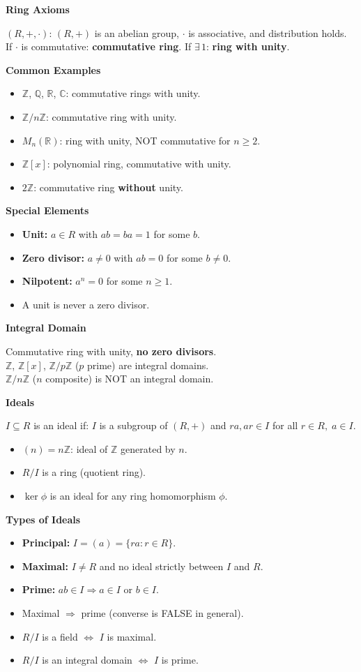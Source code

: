 \documentclass[10pt,twocolumn]{article}
\newcommand{\subsect}[1]{\smallskip\noindent\textbf{#1}\par}
\begin{document}
\subsect{Ring Axioms}
$(R,+,\cdot)$: $(R,+)$ is an abelian group, $\cdot$ is associative, and distribution holds.\\
If $\cdot$ is commutative: \textbf{commutative ring}. If $\exists\,1$: \textbf{ring with unity}.

\subsect{Common Examples}
\begin{itemize}[nosep,leftmargin=*]
\item $\mathbb{Z}$, $\mathbb{Q}$, $\mathbb{R}$, $\mathbb{C}$: commutative rings with unity.
\item $\mathbb{Z}/n\mathbb{Z}$: commutative ring with unity.
\item $M_n(\mathbb{R})$: ring with unity, NOT commutative for $n\ge 2$.
\item $\mathbb{Z}[x]$: polynomial ring, commutative with unity.
\item $2\mathbb{Z}$: commutative ring \textbf{without} unity.
\end{itemize}

\subsect{Special Elements}
\begin{itemize}[nosep,leftmargin=*]
\item \textbf{Unit:} $a\in R$ with $ab=ba=1$ for some $b$.
\item \textbf{Zero divisor:} $a\neq 0$ with $ab=0$ for some $b\neq 0$.
\item \textbf{Nilpotent:} $a^n=0$ for some $n\ge 1$.
\item A unit is never a zero divisor.
\end{itemize}

\subsect{Integral Domain}
Commutative ring with unity, \textbf{no zero divisors}.\\
$\mathbb{Z}$, $\mathbb{Z}[x]$, $\mathbb{Z}/p\mathbb{Z}$ ($p$ prime) are integral domains.\\
$\mathbb{Z}/n\mathbb{Z}$ ($n$ composite) is NOT an integral domain.

\subsect{Ideals}
$I\subseteq R$ is an ideal if: $I$ is a subgroup of $(R,+)$ and $ra,ar\in I$ for all $r\in R,\;a\in I$.
\begin{itemize}[nosep,leftmargin=*]
\item $(n) = n\mathbb{Z}$: ideal of $\mathbb{Z}$ generated by $n$.
\item $R/I$ is a ring (quotient ring).
\item $\ker\phi$ is an ideal for any ring homomorphism $\phi$.
\end{itemize}

\subsect{Types of Ideals}
\begin{itemize}[nosep,leftmargin=*]
\item \textbf{Principal:} $I=(a)=\{ra:r\in R\}$.
\item \textbf{Maximal:} $I\neq R$ and no ideal strictly between $I$ and $R$.
\item \textbf{Prime:} $ab\in I\Rightarrow a\in I$ or $b\in I$.
\item Maximal $\Rightarrow$ prime (converse is FALSE in general).
\item $R/I$ is a field $\iff$ $I$ is maximal.
\item $R/I$ is an integral domain $\iff$ $I$ is prime.
\end{itemize}
\end{document}
